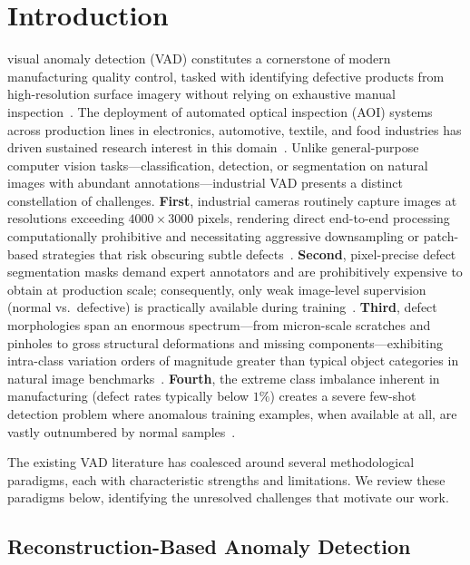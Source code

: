 \documentclass[lettersize,journal]{IEEEtran}
\begin{document}
\section{Introduction}
 visual anomaly detection (VAD) constitutes a cornerstone of modern manufacturing quality control, tasked with identifying defective products from high-resolution surface imagery without relying on exhaustive manual inspection~\cite{bergmann2019mvtec}. The deployment of automated optical inspection (AOI) systems across production lines in electronics, automotive, textile, and food industries has driven sustained research interest in this domain~\cite{czimmermann2020survey,tao2022survey}. Unlike general-purpose computer vision tasks---classification, detection, or segmentation on natural images with abundant annotations---industrial VAD presents a distinct constellation of challenges. \textbf{First}, industrial cameras routinely capture images at resolutions exceeding $4000 \times 3000$ pixels, rendering direct end-to-end processing computationally prohibitive and necessitating aggressive downsampling or patch-based strategies that risk obscuring subtle defects~\cite{bergmann2019mvtec}. \textbf{Second}, pixel-precise defect segmentation masks demand expert annotators and are prohibitively expensive to obtain at production scale; consequently, only weak image-level supervision (normal vs.~defective) is practically available during training~\cite{rippel2020modeling}. \textbf{Third}, defect morphologies span an enormous spectrum---from micron-scale scratches and pinholes to gross structural deformations and missing components---exhibiting intra-class variation orders of magnitude greater than typical object categories in natural image benchmarks~\cite{bergmann2021mvtacd}. \textbf{Fourth}, the extreme class imbalance inherent in manufacturing (defect rates typically below $1\%$) creates a severe few-shot detection problem where anomalous training examples, when available at all, are vastly outnumbered by normal samples~\cite{cohen2020spade}.

The existing VAD literature has coalesced around several methodological paradigms, each with characteristic strengths and limitations. We review these paradigms below, identifying the unresolved challenges that motivate our work.

\subsection{Reconstruction-Based Anomaly Detection}
\end{document}
